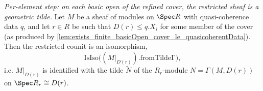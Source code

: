 
\begin{lemma}
  \label{lem:isIso_fromTildeΓ_basicOpen_of_quasicoherent}
  \textit{Per-element step: on each basic open of the refined cover, the restricted sheaf is a
  geometric tilde.}
  Let \(M\) be a sheaf of modules on \(\Spec R\) with quasi-coherence data \(q\), and let \(r \in R\)
  be such that \(D(r) \le q.X_i\) for some member of the cover (as produced by
  \cref{lem:exists_finite_basicOpen_cover_le_quasicoherentData}). Then the restricted counit is an
  isomorphism,
  \[
    \mathrm{IsIso}\bigl((M|_{D(r)}).\mathrm{fromTildeΓ}\bigr),
  \]
  i.e. \(M|_{D(r)}\) is identified with the tilde \(\widetilde{N}\) of the \(R_r\)-module
  \(N = \Gamma(M, D(r))\) on \(\Spec R_r \cong D(r)\).
\end{lemma}
